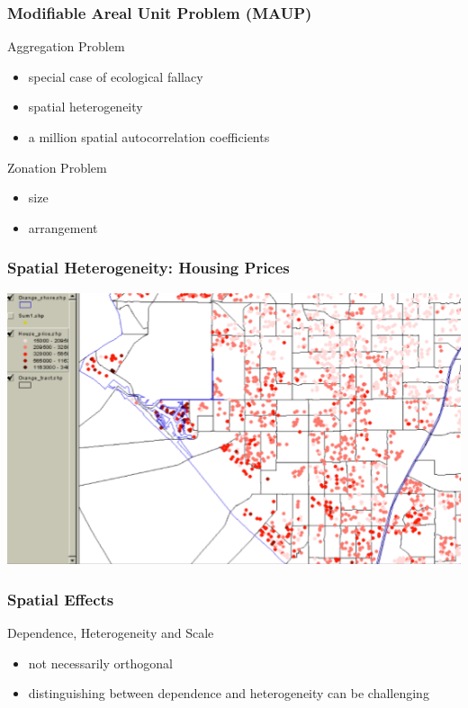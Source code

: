 \documentclass[nototal]{beamer}
\begin{document}
  \begin{frame}
    \frametitle{Modifiable Areal Unit Problem (MAUP)}
    \begin{block}{Aggregation Problem}
      \begin{itemize}
	\item special case of ecological fallacy
	\item spatial heterogeneity
	\item a million spatial autocorrelation coefficients
      \end{itemize}
    \end{block}
    \begin{block}{Zonation Problem}
      \begin{itemize}
	\item size
	\item arrangement
      \end{itemize}
    \end{block}
  \end{frame}
  \begin{frame}
    \frametitle{Spatial Heterogeneity: Housing Prices}
    \begin{center}
      \includegraphics[width=.65\linewidth]{ochousing.png}
    \end{center}
  \end{frame}

  \begin{frame}
    \frametitle{Spatial Effects}
    \begin{block}{Dependence, Heterogeneity and Scale}
      \begin{itemize}
	\item not necessarily orthogonal
	\item distinguishing between dependence and heterogeneity can be
	  challenging
      \end{itemize}
     \end{block}
   \end{frame}
\end{document}
